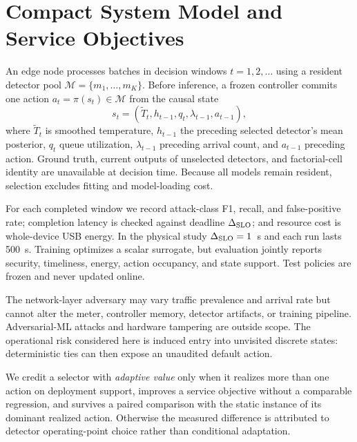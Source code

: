 \section{Compact System Model and Service Objectives}
\label{sec:system}
An edge node processes batches in decision windows $t=1,2,\ldots$ using a resident detector pool $\mathcal M=\{m_1,\ldots,m_K\}$. Before inference, a frozen controller commits one action $a_t=\pi(s_t)\in\mathcal M$ from the causal state
\begin{equation}\label{eq:state}
s_t=(\widetilde T_t,h_{t-1},q_t,\lambda_{t-1},a_{t-1}),
\end{equation}
where $\widetilde T_t$ is smoothed temperature, $h_{t-1}$ the preceding selected detector's mean posterior, $q_t$ queue utilization, $\lambda_{t-1}$ preceding arrival count, and $a_{t-1}$ preceding action. Ground truth, current outputs of unselected detectors, and factorial-cell identity are unavailable at decision time. Because all models remain resident, selection excludes fitting and model-loading cost.

For each completed window we record attack-class F1, recall, and false-positive rate; completion latency is checked against deadline $\Delta_{\rm SLO}$; and resource cost is whole-device USB energy. In the physical study $\Delta_{\rm SLO}=1$~s and each run lasts 500~s. Training optimizes a scalar surrogate, but evaluation jointly reports security, timeliness, energy, action occupancy, and state support. Test policies are frozen and never updated online.

The network-layer adversary may vary traffic prevalence and arrival rate but cannot alter the meter, controller memory, detector artifacts, or training pipeline. Adversarial-ML attacks and hardware tampering are outside scope. The operational risk considered here is induced entry into unvisited discrete states: deterministic ties can then expose an unaudited default action.

We credit a selector with \emph{adaptive value} only when it realizes more than one action on deployment support, improves a service objective without a comparable regression, and survives a paired comparison with the static instance of its dominant realized action. Otherwise the measured difference is attributed to detector operating-point choice rather than conditional adaptation.
